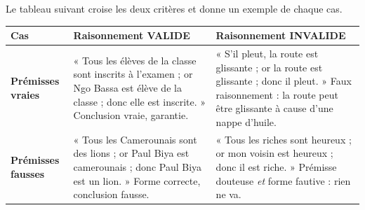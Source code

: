 \documentclass[11pt]{article}
\begin{document}
Le tableau suivant croise les deux critères et donne un exemple de chaque cas.

\begin{center}
\begin{tabularx}{\linewidth}{|l|X|X|}
\hline
\rowcolor{popblueL} \textbf{Cas} & \textbf{Raisonnement VALIDE} & \textbf{Raisonnement INVALIDE} \\
\hline
\textbf{Prémisses vraies} & « Tous les élèves de la classe sont inscrits à l'examen ; or Ngo Bassa est élève de la classe ; donc elle est inscrite. » Conclusion vraie, garantie. & « S'il pleut, la route est glissante ; or la route est glissante ; donc il pleut. » Faux raisonnement : la route peut être glissante à cause d'une nappe d'huile. \\
\hline
\textbf{Prémisses fausses} & « Tous les Camerounais sont des lions ; or Paul Biya est camerounais ; donc Paul Biya est un lion. » Forme correcte, conclusion fausse. & « Tous les riches sont heureux ; or mon voisin est heureux ; donc il est riche. » Prémisse douteuse \emph{et} forme fautive : rien ne va. \\
\hline
\end{tabularx}
\end{center}
\end{document}
